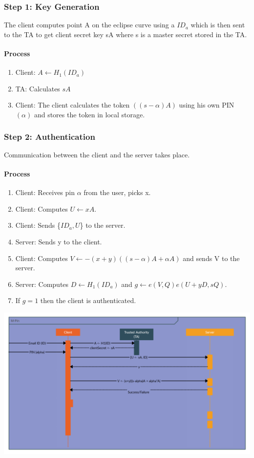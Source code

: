\documentclass[]{article}   %
\begin{document}
\subsubsection*{Step 1: Key Generation}
The client computes point A on the eclipse curve using a $ID_a$ which is then sent to the TA to get client secret key sA where s is a master secret stored in the TA.
\paragraph*{Process}
\begin{enumerate}
    \item Client: $A \leftarrow H_1(ID_a) $
    \item TA: Calculates $sA$
    \item Client: The client calculates the token $((s-\alpha)A)$ using his own PIN $(\alpha)$ and stores the token in local storage.
\end{enumerate}
\subsubsection*{Step 2: Authentication}
Communication between the client and the server takes place.
\paragraph*{Process}
\begin{enumerate}
    \item Client: Receives pin $\alpha$ from the user, picks x.
    \item Client: Computes $U \leftarrow xA$.
    \item Client: Sends \{$ID_a, U$\} to the server.
    \item Server: Sends y to the client.
    \item Client: Computes $V \leftarrow -(x+y)((s-\alpha)A +\alpha A)$ and sends V to the server.
    \item Server: Computes $D \leftarrow H_1(ID_a)$ and \newline $g \leftarrow e(V,Q)e(U+yD,sQ)$.
    \item If $g = 1$ then the client is authenticated.
\end{enumerate}
\includegraphics[width=\textwidth]{./mpin-process.png}
\newpage
\end{document}

